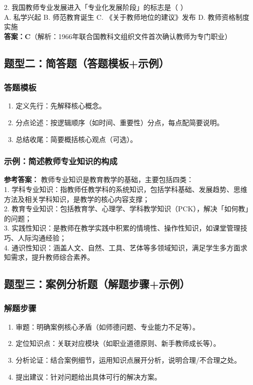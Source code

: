 \documentclass[12pt,a4paper]{article}
\begin{document}
2. 我国教师专业发展进入「专业化发展阶段」的标志是（ ）\\
A. 私学兴起 B. 师范教育诞生 C. 《关于教师地位的建议》发布 D. 教师资格制度实施\\
\textbf{答案：C}（解析：1966年联合国教科文组织文件首次确认教师为专门职业）

\subsection{题型二：简答题（答题模板+示例）}
\subsubsection{答题模板}
\begin{enumerate}[label=•,itemsep=0.3ex]
\item 定义先行：先解释核心概念。
\item 分点论述：按逻辑顺序（如时间、重要性）分点，每点配简要说明。
\item 总结收尾：简要概括核心观点（可选）。
\end{enumerate}

\subsubsection{示例：简述教师专业知识的构成}
\textbf{参考答案：}
教师专业知识是教育教学的基础，主要包括四类：\\
1. 学科专业知识：指教师任教学科的系统知识，包括学科基础、发展趋势、思维方法及相关学科知识，是教学的核心内容支撑；\\
2. 教育专业知识：包括教育学、心理学、学科教学知识（PCK），解决「如何教」的问题；\\
3. 实践性知识：是教师在教学实践中积累的情境性、操作性知识，如课堂管理技巧、人际沟通经验；\\
4. 通识性知识：涵盖人文、自然、工具、艺体等多领域知识，满足学生多方面求知需求，提升教师综合素养。

\subsection{题型三：案例分析题（解题步骤+示例）}
\subsubsection{解题步骤}
\begin{enumerate}[label=1.,itemsep=0.3ex]
\item 审题：明确案例核心矛盾（如师德问题、专业能力不足等）。
\item 定位知识点：关联对应模块（如职业道德原则、新手教师成长等）。
\item 分析论证：结合案例细节，运用知识点展开分析，说明合理/不合理之处。
\item 提出建议：针对问题给出具体可行的解决方案。
\end{enumerate}
\end{document}
